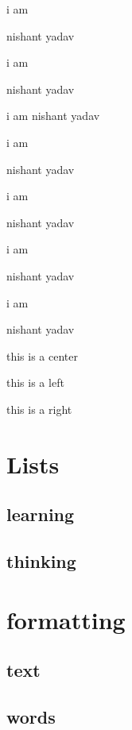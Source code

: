 \documentclass[]{article}
\begin{document}
i am \begin{huge} nishant yadav \end{huge}

i am \begin{Huge} nishant yadav \end{Huge}

i am nishant yadav

i am \begin{normalsize} nishant yadav \end{normalsize}

i am \begin{small} nishant yadav \end{small}

i am \begin{scriptsize} nishant yadav \end{scriptsize}

i am \begin{tiny} nishant yadav \end{tiny}

\vspace{2cm}

\begin{center} this is a center \end{center}

\begin{flushleft} this is a left \end{flushleft}

\begin{flushright} this is a right \end{flushright}

\vspace{2cm}


\section{Lists}
 \subsection{learning}
 \subsection{thinking}
\section{formatting}
 \subsection{text}
 \subsection{words} 
\end{document}
